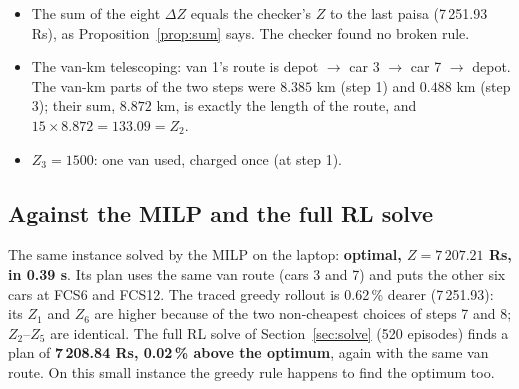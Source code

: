 \begin{itemize}
  \item The sum of the eight $\Delta Z$ equals the checker's $Z$ to the last paisa (7\,251.93 Rs), as Proposition~\ref{prop:sum} says. The checker found no broken rule.
  \item The van-km telescoping: van 1's route is depot $\to$ car 3 $\to$ car 7 $\to$ depot. The van-km parts of the two steps were $8.385$ km (step 1) and $0.488$ km (step 3); their sum, $8.872$ km, is exactly the length of the route, and $15\times8.872=133.09=Z_2$.
  \item $Z_3=1500$: one van used, charged once (at step 1).
\end{itemize}

\subsection{Against the MILP and the full RL solve}

The same instance solved by the MILP on the laptop: \textbf{optimal, $Z=7\,207.21$ Rs, in 0.39 s}. Its plan uses the same van route (cars 3 and 7) and puts the other six cars at FCS6 and FCS12. The traced greedy rollout is 0.62\,\% dearer (7\,251.93): its $Z_1$ and $Z_6$ are higher because of the two non-cheapest choices of steps 7 and 8; $Z_2$--$Z_5$ are identical. The full RL solve of Section~\ref{sec:solve} (520 episodes) finds a plan of \textbf{7\,208.84 Rs, 0.02\,\% above the optimum}, again with the same van route. On this small instance the greedy rule happens to find the optimum too.

